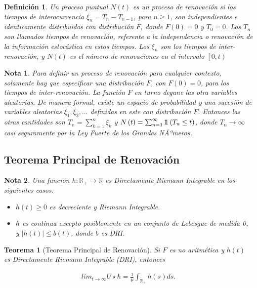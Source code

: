 \documentclass{article}
\newtheorem{Def}{Definición}
\newtheorem{Teo}{Teorema}
\newtheorem{Note}{Nota}
\newcommand{\rea}{\mathbb{R}}
\newcommand{\indora}{\mbox{$1$\hspace{-0.8ex}$1$}}
\begin{document}
\begin{Def}
Un proceso puntual $N\left(t\right)$ es un proceso de renovaci\'on si los tiempos de interocurrencia $\xi_{n}=T_{n}-T_{n-1}$, para $n\geq1$, son independientes e identicamente distribuidos con distribuci\'on $F$, donde $F\left(0\right)=0$ y $T_{0}=0$. Los $T_{n}$ son llamados tiempos de renovaci\'on, referente a la independencia o renovaci\'on de la informaci\'on estoc\'astica en estos tiempos. Los $\xi_{n}$ son los tiempos de inter-renovaci\'on, y $N\left(t\right)$ es el n\'umero de renovaciones en el intervalo $\left[0,t\right)$
\end{Def}


\begin{Note}
Para definir un proceso de renovaci\'on para cualquier contexto, solamente hay que especificar una distribuci\'on $F$, con $F\left(0\right)=0$, para los tiempos de inter-renovaci\'on. La funci\'on $F$ en turno degune las otra variables aleatorias. De manera formal, existe un espacio de probabilidad y una sucesi\'on de variables aleatorias $\xi_{1},\xi_{2},\ldots$ definidas en este con distribuci\'on $F$. Entonces las otras cantidades son $T_{n}=\sum_{k=1}^{n}\xi_{k}$ y $N\left(t\right)=\sum_{n=1}^{\infty}\indora\left(T_{n}\leq t\right)$, donde $T_{n}\rightarrow\infty$ casi seguramente por la Ley Fuerte de los Grandes NÃºmeros.
\end{Note}

%
\subsection{Teorema Principal de Renovaci\'on}
%

\begin{Note} Una funci\'on $h:\rea_{+}\rightarrow\rea$ es Directamente Riemann Integrable en los siguientes casos:
\begin{itemize}
\item[a)] $h\left(t\right)\geq0$ es decreciente y Riemann Integrable.
\item[b)] $h$ es continua excepto posiblemente en un conjunto de Lebesgue de medida 0, y $|h\left(t\right)|\leq b\left(t\right)$, donde $b$ es DRI.
\end{itemize}
\end{Note}

\begin{Teo}[Teorema Principal de Renovaci\'on]
Si $F$ es no aritm\'etica y $h\left(t\right)$ es Directamente Riemann Integrable (DRI), entonces

\begin{eqnarray*}
lim_{t\rightarrow\infty}U\star h=\frac{1}{\mu}\int_{\rea_{+}}h\left(s\right)ds.
\end{eqnarray*}
\end{Teo}
\end{document}
